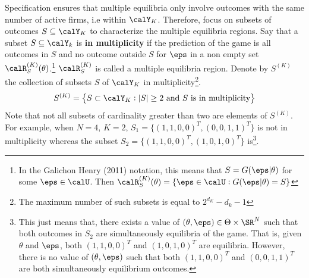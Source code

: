 Specification ensures that multiple equilibria only involve outcomes with the same number of active firms, i.e within $\calY_K$. Therefore, focus on subsets of outcomes $S\subseteq \calY_K$ to characterize the multiple equilibria regions. Say that a subset $S\subseteq \calY_k$ is \textbf{in multiplicity} if the prediction of the game is all outcomes in $S$ and no outcome outside $S$ for $\eps$ in a non empty set $\calR_S^{(K)}(\theta)$.\footnote{In the Galichon Henry (2011) notation, this means that \(S = G(\eps|\theta)\) for some \(\eps \in \calU\). Then $\calR_S^{(K)}(\theta) = \{\eps \in \calU : G(\eps|\theta) = S\}$}
$\calR_S^{(K)}$ is called a multiple equilibria region. Denote by $S^{(K)}$ the collection of subsets $S$ of $\calY_K$ in multiplicity\footnote{The maximum number of such subsets is equal to $2^{d_K} - d_k - 1$}.
\[S^{(K)} = \left\{S\subset \calY_K: |S|\geq 2\text{ and $S$ is in multiplicity}\right\}\]
Note that not all subsets of cardinality greater than two are elements of $S^{(K)}$. For example, when $N = 4$, $K = 2$, $S_1 = \{(1,1,0,0)^T,(0,0,1,1)^T\}$ is not in multiplicity whereas the subset $S_2 = \{(1,1,0,0)^T,(1,0,1,0)^T\}$ is\footnote{This just means that, there exists a value of $(\theta,\eps)\in \Theta \times \SR^{N}$ such that both outcomes in $S_2$ are simultaneously equilibria of the game. That is, given $\theta$ and $\eps$, both $(1,1,0,0)^T$ and $(1,0,1,0)^T$ are equilibria. However, there is no value of $(\theta,\eps)$ such that both $(1,1,0,0)^T$ and $(0,0,1,1)^T$ are both simultaneously equilibrium outcomes.}.

